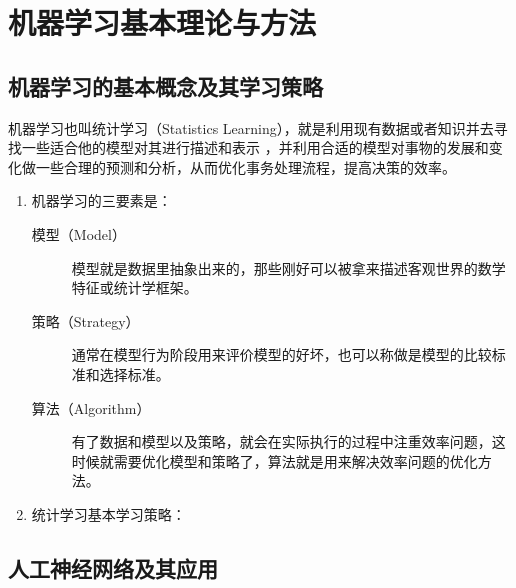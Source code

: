 \documentclass[12pt,a4paper,UTF8]{ctexart}
\begin{document}
\section{机器学习基本理论与方法}
\subsection{机器学习的基本概念及其学习策略}
机器学习也叫统计学习（Statistics Learning），就是利用现有数据或者知识并去寻找一些适合他的模型对其进行描述和表示
，并利用合适的模型对事物的发展和变化做一些合理的预测和分析，从而优化事务处理流程，提高决策的效率。
\begin{enumerate}
    \item 机器学习的三要素是：
    \begin{description}
        \item[模型（Model）] 模型就是数据里抽象出来的，那些刚好可以被拿来描述客观世界的数学特征或统计学框架。
        \item[策略（Strategy）] 通常在模型行为阶段用来评价模型的好坏，也可以称做是模型的比较标准和选择标准。
        \item[算法（Algorithm）] 有了数据和模型以及策略，就会在实际执行的过程中注重效率问题，这时候就需要优化模型和策略了，算法就是用来解决效率问题的优化方法。
    \end{description}
    \item 统计学习基本学习策略：
\end{enumerate}
\subsection{人工神经网络及其应用}
\end{document}
